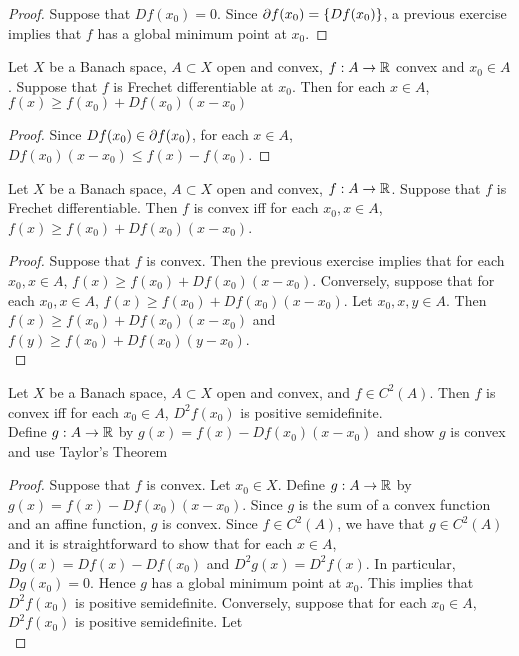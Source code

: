 \documentclass{book}
\begin{document}
	\begin{proof}
	Suppose that $Df(x_0) = 0$. Since $\partial f(x_0) = \{Df(x_0)\}$, a previous exercise implies that $f$ has a global minimum point at $x_0$. 
	\end{proof}
	
	\begin{ex}
	Let $X$ be a Banach space, $A \subset X$ open and convex, $f:A \rightarrow \mathbb{R}$ convex and $x_0 \in A$. Suppose that $f$ is Frechet differentiable at $x_0$. Then for each $x \in A$, $f(x) \geq f(x_0) + Df(x_0)(x - x_0)$
	\end{ex}
	
	\begin{proof}
	Since $Df(x_0) \in \partial f(x_0)$, for each $x \in A$, $Df(x_0)(x - x_0) \leq f(x) - f(x_0)$.
	\end{proof}
	
	\begin{ex}
	Let $X$ be a Banach space, $A \subset X$ open and convex, $f:A \rightarrow \mathbb{R}$. Suppose that $f$ is Frechet differentiable. Then $f$ is convex iff for each $x_0, x \in A$, $f(x) \geq f(x_0) + Df(x_0)(x - x_0)$.
	\end{ex}
	
	\begin{proof}
	Suppose that $f$ is convex. Then the previous exercise implies that for each $x_0,x \in A$, $f(x) \geq f(x_0) + Df(x_0)(x - x_0)$. Conversely, suppose that for each $x_0,x \in A$, $f(x) \geq f(x_0) + Df(x_0)(x - x_0)$. Let $x_0, x, y \in A$. Then $f(x) \geq f(x_0) + Df(x_0)(x - x_0)$ and $f(y) \geq f(x_0) + Df(x_0)(y - x_0)$. \\
	\end{proof}
	
	\begin{ex} \lex{}
	Let $X$ be a Banach space, $A \subset X$ open and convex, and $f \in C^2(A)$. Then $f$ is convex iff for each $x_0 \in A$, $D^2f(x_0)$ is positive semidefinite.\\
	 Define $g:A \rightarrow \mathbb{R}$ by $g(x) = f(x) - Df(x_0)(x - x_0)$ and show $g$ is convex and use Taylor's Theorem
	\end{ex}
	
	\begin{proof}
	Suppose that $f$ is convex. Let $x_0 \in X$. Define $g:A \rightarrow \mathbb{R}$ by $g(x) = f(x) - Df(x_0)(x - x_0)$. Since $g$ is the sum of a convex function and an affine function, $g$ is convex. Since $f \in C^2(A)$, we have that $g \in C^2(A)$ and it is straightforward to show that for each $x \in A$, $Dg(x) = Df(x) - Df(x_0)$ and $D^2g(x) = D^2f(x)$. In particular, $Dg(x_0) = 0$. Hence $g$ has a global minimum point at $x_0$. This implies that $D^2f(x_0)$ is positive semidefinite. 
	Conversely, suppose that for each $x_0 \in A$, $D^2f(x_0)$ is positive semidefinite. Let  \\
	\end{proof}
	
\end{document}
